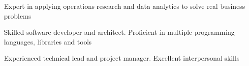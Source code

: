 


\vspace{-4mm}
\cventry
{} %
{} %
{} %
{} %
{
\begin{cvitems} %
    \item  {Expert in applying operations research and data analytics to solve real business problems} %
	\item  {Skilled software developer and architect. Proficient in multiple programming languages, libraries and tools} 
	\item  {Experienced technical lead and project manager. Excellent interpersonal skills} 
\end{cvitems}    
}

